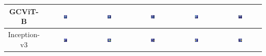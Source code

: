 \begin{table}
\begin{tabular}{|c|c|c|c|c|c|}
        GCViT-B & \includegraphics[width=0.15\textwidth]{figs/gradcams/gradcam_gcvit_kl0.png} & \includegraphics[width=0.15\textwidth]{figs/gradcams/gradcam_gcvit_kl1.png} & \includegraphics[width=0.15\textwidth]{figs/gradcams/gradcam_gcvit_kl2.png} & \includegraphics[width=0.15\textwidth]{figs/gradcams/gradcam_gcvit_kl3.png} & \includegraphics[width=0.15\textwidth]{figs/gradcams/gradcam_gcvit_kl4.png} \\ \hline
        Inception-v3 & \includegraphics[width=0.15\textwidth]{figs/gradcams/gradcam_inceptionv3_kl0.png} & \includegraphics[width=0.15\textwidth]{figs/gradcams/gradcam_inceptionv3_kl1.png} & \includegraphics[width=0.15\textwidth]{figs/gradcams/gradcam_inceptionv3_kl2.png} & \includegraphics[width=0.15\textwidth]{figs/gradcams/gradcam_inceptionv3_kl3.png} & \includegraphics[width=0.15\textwidth]{figs/gradcams/gradcam_inceptionv3_kl4.png} \\ \hline
    \end{tabular}
\end{table}